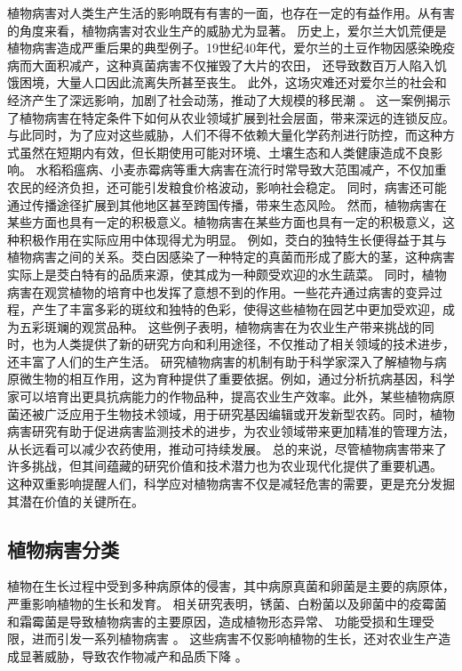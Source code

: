 \documentclass[AutoFakeBold]{LZUThesis-PgD&PhD}
\begin{document}
	植物病害对人类生产生活的影响既有有害的一面，也存在一定的有益作用。从有害的角度来看，植物病害对农业生产的威胁尤为显著。
	历史上，爱尔兰大饥荒便是植物病害造成严重后果的典型例子。19世纪40年代，爱尔兰的土豆作物因感染晚疫病而大面积减产，这种真菌病害不仅摧毁了大片的农田，
	还导致数百万人陷入饥饿困境，大量人口因此流离失所甚至丧生。
	此外，这场灾难还对爱尔兰的社会和经济产生了深远影响，加剧了社会动荡，推动了大规模的移民潮 \cite{ograda2009great}。
	这一案例揭示了植物病害在特定条件下如何从农业领域扩展到社会层面，带来深远的连锁反应。
	与此同时，为了应对这些威胁，人们不得不依赖大量化学药剂进行防控，而这种方式虽然在短期内有效，但长期使用可能对环境、土壤生态和人类健康造成不良影响。
	水稻稻瘟病、小麦赤霉病等重大病害在流行时常导致大范围减产，不仅加重农民的经济负担，还可能引发粮食价格波动，影响社会稳定。
	同时，病害还可能通过传播途径扩展到其他地区甚至跨国传播，带来生态风险。
	然而，植物病害在某些方面也具有一定的积极意义。植物病害在某些方面也具有一定的积极意义，这种积极作用在实际应用中体现得尤为明显。
	例如，茭白的独特生长便得益于其与植物病害之间的关系。茭白因感染了一种特定的真菌而形成了膨大的茎，这种病害实际上是茭白特有的品质来源，使其成为一种颇受欢迎的水生蔬菜。
	同时，植物病害在观赏植物的培育中也发挥了意想不到的作用。一些花卉通过病害的变异过程，产生了丰富多彩的斑纹和独特的色彩，使得这些植物在园艺中更加受欢迎，成为五彩斑斓的观赏品种。
	这些例子表明，植物病害在为农业生产带来挑战的同时，也为人类提供了新的研究方向和利用途径，不仅推动了相关领域的技术进步，还丰富了人们的生产生活。
	研究植物病害的机制有助于科学家深入了解植物与病原微生物的相互作用，这为育种提供了重要依据。例如，通过分析抗病基因，科学家可以培育出更具抗病能力的作物品种，提高农业生产效率。此外，某些植物病原菌还被广泛应用于生物技术领域，用于研究基因编辑或开发新型农药。同时，植物病害研究有助于促进病害监测技术的进步，为农业领域带来更加精准的管理方法，从长远看可以减少农药使用，推动可持续发展。
	总的来说，尽管植物病害带来了许多挑战，但其间蕴藏的研究价值和技术潜力也为农业现代化提供了重要机遇。
	这种双重影响提醒人们，科学应对植物病害不仅是减轻危害的需要，更是充分发掘其潜在价值的关键所在。
	
	
	
	\subsection{植物病害分类}
	
	植物在生长过程中受到多种病原体的侵害，其中病原真菌和卵菌是主要的病原体，严重影响植物的生长和发育。
	相关研究表明，锈菌、白粉菌以及卵菌中的疫霉菌和霜霉菌是导致植物病害的主要原因，造成植物形态异常、
	功能受损和生理受限，进而引发一系列植物病害 \citep{mendgen2002plant, glawe2008powdery, kamoun2015top, thines2016diversity}。
	这些病害不仅影响植物的生长，还对农业生产造成显著威胁，导致农作物减产和品质下降 \citep{gisi2002mechanisms, erwin1996phytophthora}。
	
\end{document}
